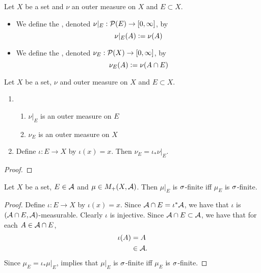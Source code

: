 \documentclass{book}
\begin{document}
	\begin{defn}  
		Let $X$ be a set and $\nu$ an outer measure on $X$ and $E \subset X$. 
		\begin{itemize}
			\item We define the , denoted $\nu|_E: \mathcal{P}(E) \rightarrow [0,\infty]$, by 
			$$\nu|_E(A) \vcentcolon= \nu(A)$$
			\item We define the , denoted $\nu_E: \mathcal{P}(X) \rightarrow [0,\infty]$, by 
			$$\nu_E(A) \vcentcolon= \nu(A \cap E)$$
		\end{itemize}
	\end{defn}

	\begin{ex}  
		Let $X$ be a set, $\nu$ and outer measure on $X$ and $E \subset X$. 
		\begin{enumerate}
			\item \begin{enumerate}
				\item $\nu|_E$ is an outer measure on $E$
				\item $\nu_E$ is an outer measure on $X$
			\end{enumerate}
			\item Define $\iota:E \rightarrow X$ by $\iota(x) = x$. Then $\nu_E = \iota_*\nu|_E$.
		\end{enumerate}
		
	\end{ex}

	\begin{proof}
	\end{proof}

	\begin{ex}  
		Let $X$ be a set, $E \in \mathcal{A}$ and $\mu \in M_+(X, \mathcal{A})$. Then $\mu|_E$ is $\sigma$-finite iff $\mu_E$ is $\sigma$-finite.
	\end{ex}

	\begin{proof} 
		Define $\iota:E \rightarrow X$ by $\iota(x) = x$. Since $\mathcal{A} \cap E = \iota^*\mathcal{A}$, we have that $\iota$ is $(\mathcal{A} \cap E, \mathcal{A})$-measurable. Clearly $\iota$ is injective. Since $\mathcal{A} \cap E \subset \mathcal{A}$, we have that for each $A \in \mathcal{A} \cap E$,  
		\begin{align*}
			\iota(A) 
			& = A \\
			& \in \mathcal{A}.
		\end{align*}
		Since $\mu_E = \iota_* \mu|_E$,  implies that $\mu|_E$ is $\sigma$-finite iff $\mu_E$ is $\sigma$-finite.
	\end{proof}
\end{document}
